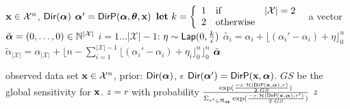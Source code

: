\documentclass{article}
\begin{document}
\begin{algorithm}
  \caption{$\ilapmech$}
  \label{ilapmech}
  \begin{algorithmic}
   $\textbf{x}\in\mathcal{X}^n$, $\mathsf{Dir}(\boldsymbol{\alpha})$
  \STATE {} $\boldsymbol{\alpha}' = \mathsf{DirP}(\boldsymbol{\alpha},\boldsymbol{\theta},\textbf{x})$
  \STATE \quad ${\bf let}\ k=\left \{
        \begin{array}{lll}          
          1&\text{if}& |\mathcal{X}|=2\\
          2&\text{otherwise}
        \end{array}
      \right .\ $
  \STATE {} a vector $\tilde{\boldsymbol{\alpha}} = (0, \dots, 0 )\in \mathbb{N}^{|\mathcal{X}|}$ 
  \STATE {} $i = 1 \dots |\mathcal{X}|-1$:
  \STATE \quad {} $\eta \sim \mathsf{Lap}(0, \frac{k}{\epsilon})$
  \STATE \quad \quad  $\tilde{\alpha_i}=\alpha_i + \lfloor{(\alpha_i' - \alpha_i) + \eta}\rfloor^n_0$ 
  \STATE \quad $\tilde{\alpha}_{|\mathcal{X}|} = \alpha_{|\mathcal{X}|} + \lfloor n - \sum_{i = 1}^{|\mathcal{X}|-1}\lfloor{(\alpha_i' - \alpha_i) + \eta_i}\rfloor^n_0 \rfloor^n_0$
   $\tilde{\boldsymbol{\alpha}}$
  \end{algorithmic}
\end{algorithm}
%
%
%
%
%
%
%
%
%
  \begin{algorithm}
  \caption{$\expmech$}
  \label{mech:expmech1}
  \begin{algorithmic}
  \STATE observed data set $\textbf{x} \in \mathcal{X}^n$, prior: $\mathsf{Dir}(\boldsymbol{\alpha})$, $\epsilon$
  \STATE {} $\mathsf{Dir}(\boldsymbol{\alpha}')= \mathsf{DirP}(\textbf{x},\boldsymbol{\alpha})$.   
  \STATE {} $GS$ be the global sensitivity for $\textbf{x}$.
  \STATE {} $z=r$ with probability $\frac
  {\exp(\frac{-\epsilon\cdot \mathcal{H}(\mathsf{DirP}(\textbf{x},\boldsymbol{\alpha}), r)}{2\cdot GS})}
{\Sigma_{r' \in \mathcal{R}_{\boldsymbol{\alpha}}}\exp(\frac{-\epsilon\cdot \mathcal{H}(\mathsf{DirP}(\textbf{x},\boldsymbol{\alpha}), r')}{2\cdot GS})}$
 $z$
  \end{algorithmic}
  \end{algorithm}
\end{document}
